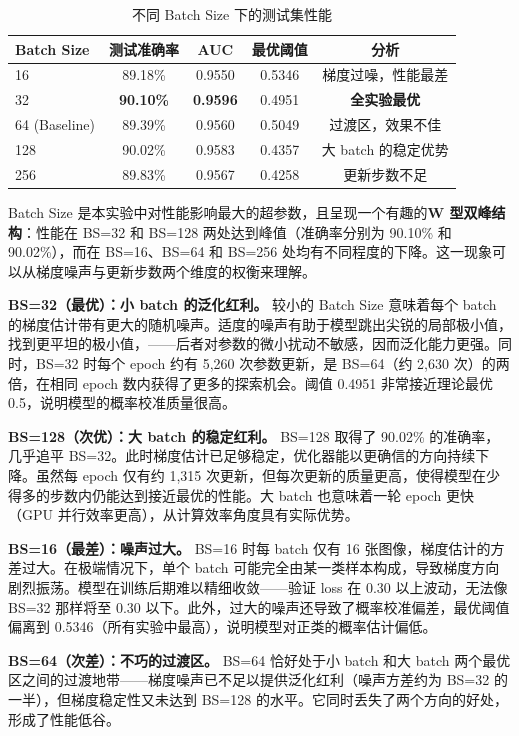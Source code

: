 \documentclass[12pt,a4paper]{ctexart}
\begin{document}
\begin{table}[H]
\centering
\caption{不同 Batch Size 下的测试集性能}
\begin{tabular}{lcccc}
\toprule
Batch Size & 测试准确率 & AUC & 最优阈值 & 分析 \\
\midrule
16  & 89.18\% & 0.9550 & 0.5346 & 梯度过噪，性能最差 \\
32  & \textbf{90.10\%} & \textbf{0.9596} & 0.4951 & \textbf{全实验最优} \\
64 (Baseline) & 89.39\% & 0.9560 & 0.5049 & 过渡区，效果不佳 \\
128 & 90.02\% & 0.9583 & 0.4357 & 大 batch 的稳定优势 \\
256 & 89.83\% & 0.9567 & 0.4258 & 更新步数不足 \\
\bottomrule
\end{tabular}
\end{table}

Batch Size 是本实验中对性能影响最大的超参数，且呈现一个有趣的\textbf{W 型双峰结构}：性能在 BS=32 和 BS=128 两处达到峰值（准确率分别为 90.10\% 和 90.02\%），而在 BS=16、BS=64 和 BS=256 处均有不同程度的下降。这一现象可以从梯度噪声与更新步数两个维度的权衡来理解。

\textbf{BS=32（最优）：小 batch 的泛化红利。} 较小的 Batch Size 意味着每个 batch 的梯度估计带有更大的随机噪声。适度的噪声有助于模型跳出尖锐的局部极小值，找到更平坦的极小值，——后者对参数的微小扰动不敏感，因而泛化能力更强。同时，BS=32 时每个 epoch 约有 5,260 次参数更新，是 BS=64（约 2,630 次）的两倍，在相同 epoch 数内获得了更多的探索机会。阈值 0.4951 非常接近理论最优 0.5，说明模型的概率校准质量很高。

\textbf{BS=128（次优）：大 batch 的稳定红利。} BS=128 取得了 90.02\% 的准确率，几乎追平 BS=32。此时梯度估计已足够稳定，优化器能以更确信的方向持续下降。虽然每 epoch 仅有约 1,315 次更新，但每次更新的质量更高，使得模型在少得多的步数内仍能达到接近最优的性能。大 batch 也意味着一轮 epoch 更快（GPU 并行效率更高），从计算效率角度具有实际优势。

\textbf{BS=16（最差）：噪声过大。} BS=16 时每 batch 仅有 16 张图像，梯度估计的方差过大。在极端情况下，单个 batch 可能完全由某一类样本构成，导致梯度方向剧烈振荡。模型在训练后期难以精细收敛——验证 loss 在 0.30 以上波动，无法像 BS=32 那样将至 0.30 以下。此外，过大的噪声还导致了概率校准偏差，最优阈值偏离到 0.5346（所有实验中最高），说明模型对正类的概率估计偏低。

\textbf{BS=64（次差）：不巧的过渡区。} BS=64 恰好处于小 batch 和大 batch 两个最优区之间的过渡地带——梯度噪声已不足以提供泛化红利（噪声方差约为 BS=32 的一半），但梯度稳定性又未达到 BS=128 的水平。它同时丢失了两个方向的好处，形成了性能低谷。
\end{document}

